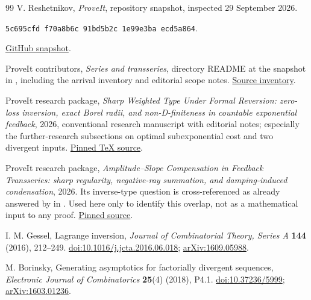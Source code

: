 \documentclass[11pt,a4paper]{article}
\theoremstyle{definition}
\theoremstyle{remark}
\newcommand{\commit}{\texttt{5c695cfd\,f70a8b6c\,91bd5b2c\,1e99e3ba\,ecd5a864}}
\numberwithin{equation}{section}
\begin{document}
\begin{thebibliography}{99}
V. Reshetnikov, \emph{ProveIt}, repository snapshot, inspected
29 September 2026.\par
\commit.\par
\href{https://github.com/VladimirReshetnikov/ProveIt/commit/5c695cfdf70a8b6c91bd5b2c1e99e3baecd5a864}{GitHub snapshot}.

ProveIt contributors, \emph{Series and transseries}, directory README
at the snapshot in \cite{repo}, including the arrival inventory and
editorial scope notes.
\href{https://github.com/VladimirReshetnikov/ProveIt/blob/5c695cfdf70a8b6c91bd5b2c1e99e3baecd5a864/Analysis/Transseries/docs/series-and-transseries/README.md}{Source inventory}.

ProveIt research package, \emph{Sharp Weighted Type Under Formal
Reversion: zero-loss inversion, exact Borel radii, and non-D-finiteness
in countable exponential feedback}, 2026, conventional research
manuscript with editorial notes; especially the further-research
subsections on optimal subexponential cost and two divergent inputs.
\href{https://github.com/VladimirReshetnikov/ProveIt/blob/5c695cfdf70a8b6c91bd5b2c1e99e3baecd5a864/Analysis/Transseries/docs/series-and-transseries/Sharp_Weighted_Type_Formal_Reversion/article.tex}{Pinned TeX source}.

ProveIt research package, \emph{Amplitude--Slope Compensation in
Feedback Transseries: sharp regularity, negative-ray summation, and
damping-induced condensation}, 2026. Its inverse-type question is
cross-referenced as already answered by \cite{weighted} in
\cite{inventory}. Used here only to identify this overlap, not as a
mathematical input to any proof.
\href{https://github.com/VladimirReshetnikov/ProveIt/blob/5c695cfdf70a8b6c91bd5b2c1e99e3baecd5a864/Analysis/Transseries/docs/series-and-transseries/Amplitude_Slope_Compensation_Feedback_Transseries/article.tex}{Pinned source}.

I. M. Gessel, Lagrange inversion, \emph{Journal of Combinatorial Theory,
Series A} \textbf{144} (2016), 212--249.
\href{https://doi.org/10.1016/j.jcta.2016.06.018}{doi:10.1016/j.jcta.2016.06.018};
\href{https://arxiv.org/abs/1609.05988}{arXiv:1609.05988}.

M. Borinsky, Generating asymptotics for factorially divergent sequences,
\emph{Electronic Journal of Combinatorics} \textbf{25}(4) (2018), P4.1.
\href{https://doi.org/10.37236/5999}{doi:10.37236/5999};
\href{https://arxiv.org/abs/1603.01236}{arXiv:1603.01236}.


\end{thebibliography}
\end{document}
